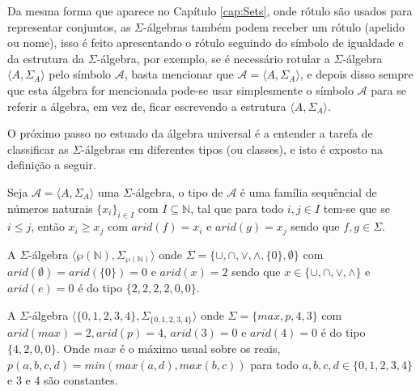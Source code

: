 \begin{nota}
  Da mesma forma que aparece no Capítulo \ref{cap:Sets}, onde rótulo são usados para representar conjuntos, as $\Sigma$-álgebras também podem receber um rótulo (apelido ou nome), isso é feito apresentando o rótulo seguindo do símbolo de igualdade e da estrutura da $\Sigma$-álgebra, por exemplo, se é necessário rotular a $\Sigma$-álgebra $\langle A, \Sigma_A \rangle$ pelo símbolo $\mathcal{A}$, basta mencionar que $\mathcal{A} = \langle A, \Sigma_A \rangle$, e depois disso sempre que esta álgebra for mencionada pode-se usar simplesmente o símbolo $\mathcal{A}$ para se referir a álgebra, em vez de, ficar escrevendo a estrutura $\langle A, \Sigma_A \rangle$.
\end{nota}

O próximo passo no estuado da álgebra universal é a entender a tarefa de classificar as $\Sigma$-álgebras em diferentes tipos (ou classes), e isto é exposto na definição a seguir.

\begin{definicao}
  Seja $\mathcal{A} = \langle A, \Sigma_A \rangle$ uma $\Sigma$-álgebra, o tipo de $\mathcal{A}$ é uma família sequêncial de números naturais $\{x_i\}_{i \in I}$ com $I \subseteq \mathbb{N}$, tal que para todo $i, j \in I$ tem-se que se $i \leq j$, então $x_i \geq x_j$ com $arid(f) = x_i$ e $arid(g) = x_j$ sendo que $f, g 
  \in \Sigma$.
\end{definicao}

\begin{exemplo}\label{exe:TipoSigmaAlgebra2}
  A $\Sigma$-álgebra $\langle \wp(\mathbb{N}), \Sigma_{\wp(\mathbb{N})} \rangle$ onde $\Sigma = \{ \cup, \cap, \vee, \wedge, \{0\}, \emptyset \}$ com $arid(\emptyset) = arid(\{0\}) = 0$ e $arid(x) = 2$ sendo que $x \in \{\cup, \cap, \vee, \wedge\}$ e $arid(e) = 0$ é do tipo $\{2, 2, 2, 2, 0, 0\}$.
\end{exemplo}

\begin{exemplo}\label{exe:TipoSigmaAlgebra3}
  A $\Sigma$-álgebra $\langle \{0, 1, 2, 3, 4\}, \Sigma_{\{0, 1, 2, 3, 4\}} \rangle$ onde $\Sigma = \{ max, p, 4, 3 \}$ com $arid(max) = 2, arid(p) = 4$, $arid(3) = 0$ e $arid(4) = 0$ é do tipo $\{4, 2, 0, 0\}$. Onde $max$ é o máximo usual sobre os reais, $p(a, b, c, d) = min(max(a, d), max(b, c))$ para todo $a, b, c, d \in \{0, 1, 2, 3, 4\}$ e $3$ e $4$ são constantes.
\end{exemplo}


